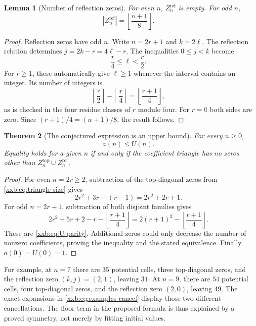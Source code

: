 \documentclass[11pt,a4paper]{article}
\numberwithin{equation}{section}
\newtheorem{theorem}{Theorem}[section]
\newtheorem{lemma}[theorem]{Lemma}
\theoremstyle{definition}
\theoremstyle{remark}
\theoremstyle{plain}
\newcommand{\U}{U}
\begin{document}
\begin{lemma}[Number of reflection zeros]\label{xxb:lem:reflection-count}
For even $n$, $Z_n^{\mathrm{ref}}$ is empty. For odd $n$,
\begin{equation}\label{xxb:eq:reflection-count}
 |Z_n^{\mathrm{ref}}|=\left\lfloor\frac{n+1}{8}\right\rfloor.
\end{equation}
\end{lemma}
\begin{proof}
Reflection zeros have odd $n$. Write $n=2r+1$ and $k=2\ell$.
The reflection relation determines
$j=2k-r=4\ell-r$. The inequalities $0\le j<k$ become
\[
 \frac r4\le\ell<\frac r2.
\]
For $r\ge1$, these automatically give $\ell\ge1$ whenever the interval
contains an integer. Its number of integers is
\[
 \left\lceil\frac r2\right\rceil-
 \left\lceil\frac r4\right\rceil
 =\left\lfloor\frac{r+1}{4}\right\rfloor,
\]
as is checked in the four residue classes of $r$ modulo four. For $r=0$
both sides are zero. Since $(r+1)/4=(n+1)/8$, the result follows.
\end{proof}

\begin{theorem}[The conjectured expression is an upper bound]\label{xxb:thm:upper}
For every $n\ge0$,
\begin{equation}\label{xxb:eq:upper}
 a(n)\le\U(n).
\end{equation}
Equality holds for a given $n$ if and only if the coefficient triangle has
no zeros other than $Z_n^{\mathrm{top}}\cup Z_n^{\mathrm{ref}}$.
\end{theorem}
\begin{proof}
For even $n=2r\ge2$, subtraction of the top-diagonal zeros from
\eqref{xxb:eq:triangle-size} gives
\[
 2r^2+3r-(r-1)=2r^2+2r+1.
\]
For odd $n=2r+1$, subtraction of both disjoint families gives
\[
 2r^2+5r+2-r-\left\lfloor\frac{r+1}{4}\right\rfloor
 =2(r+1)^2-\left\lfloor\frac{r+1}{4}\right\rfloor.
\]
These are \eqref{xxb:eq:U-parity}. Additional zeros could only decrease the
number of nonzero coefficients, proving the inequality and the stated
equivalence. Finally $a(0)=\U(0)=1$.
\end{proof}

For example, at $n=7$ there are $35$ potential cells, three top-diagonal
zeros, and the reflection zero $(k,j)=(2,1)$, leaving $31$. At $n=9$,
there are $54$ potential cells, four top-diagonal zeros, and the reflection
zero $(2,0)$, leaving $49$. The exact expansions in
\eqref{xxb:eq:examples-cancel} display those two different cancellations.
The floor term in the proposed formula is thus explained by a proved
symmetry, not merely by fitting initial values.
\end{document}

